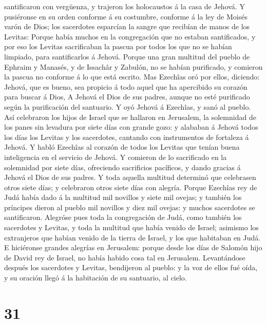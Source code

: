 santificaron con vergüenza, y trajeron los holocaustos á la casa de
Jehová.  Y pusiéronse en su orden conforme á su costumbre,
conforme á la ley de Moisés varón de Dios; los sacerdotes esparcían la
sangre que recibían de manos de los Levitas:  Porque había
muchos en la congregación que no estaban santificados, y por eso los
Levitas sacrificaban la pascua por todos los que no se habían limpiado,
para santificarlos á Jehová.  Porque una gran multitud del
pueblo de Ephraim y Manasés, y de Issachâr y Zabulón, no se habían
purificado, y comieron la pascua no conforme á lo que está escrito. Mas
Ezechîas oró por ellos, diciendo: Jehová, que es bueno, sea propicio á
todo aquel que ha apercibido su corazón para buscar á Dios,
 A Jehová el Dios de sus padres, aunque no esté purificado
según la purificación del santuario.  Y oyó Jehová á
Ezechîas, y sanó al pueblo.  Así celebraron los hijos de
Israel que se hallaron en Jerusalem, la solemnidad de los panes sin
levadura por siete días con grande gozo: y alababan á Jehová todos los
días los Levitas y los sacerdotes, cantando con instrumentos de
fortaleza á Jehová.  Y habló Ezechîas al corazón de todos
los Levitas que tenían buena inteligencia en el servicio de Jehová. Y
comieron de lo sacrificado en la solemnidad por siete días, ofreciendo
sacrificios pacíficos, y dando gracias á Jehová el Dios de sus padres.
 Y toda aquella multitud determinó que celebrasen otros
siete días; y celebraron otros siete días con alegría. 
Porque Ezechîas rey de Judá había dado á la multitud mil novillos y
siete mil ovejas; y también los príncipes dieron al pueblo mil novillos
y diez mil ovejas: y muchos sacerdotes se santificaron. 
Alegróse pues toda la congregación de Judá, como también los sacerdotes
y Levitas, y toda la multitud que había venido de Israel; asimismo los
extranjeros que habían venido de la tierra de Israel, y los que
habitaban en Judá.  E hiciéronse grandes alegrías en
Jerusalem: porque desde los días de Salomón hijo de David rey de Israel,
no había habido cosa tal en Jerusalem.  Levantándose
después los sacerdotes y Levitas, bendijeron al pueblo: y la voz de
ellos fué oída, y su oración llegó á la habitación de su santuario, al
cielo.

\hypertarget{section-30}{%
\section{31}\label{section-30}}

